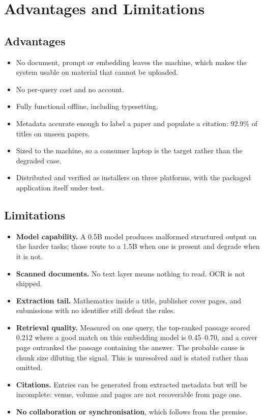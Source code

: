 \documentclass[12pt,a4paper]{report}
\begin{document}
\section{Advantages and Limitations}

\subsection{Advantages}

\begin{itemize}[leftmargin=*]
  \item No document, prompt or embedding leaves the machine, which makes the
        system usable on material that cannot be uploaded.
  \item No per-query cost and no account.
  \item Fully functional offline, including typesetting.
  \item Metadata accurate enough to label a paper and populate a citation:
        92.9\% of titles on unseen papers.
  \item Sized to the machine, so a consumer laptop is the target rather than the
        degraded case.
  \item Distributed and verified as installers on three platforms, with the
        packaged application itself under test.
\end{itemize}

\subsection{Limitations}

\begin{itemize}[leftmargin=*]
  \item \textbf{Model capability.} A 0.5B model produces malformed structured
        output on the harder tasks; those route to a 1.5B when one is present
        and degrade when it is not.
  \item \textbf{Scanned documents.} No text layer means nothing to read. OCR is
        not shipped.
  \item \textbf{Extraction tail.} Mathematics inside a title, publisher cover
        pages, and submissions with no identifier still defeat the rules.
  \item \textbf{Retrieval quality.} Measured on one query, the top-ranked
        passage scored 0.212 where a good match on this embedding model is
        0.45--0.70, and a cover page outranked the passage containing the
        answer. The probable cause is chunk size diluting the signal. This is
        unresolved and is stated rather than omitted.
  \item \textbf{Citations.} Entries can be generated from extracted metadata but
        will be incomplete: venue, volume and pages are not recoverable from
        page one.
  \item \textbf{No collaboration or synchronisation}, which follows from the
        premise.
\end{itemize}
\end{document}
